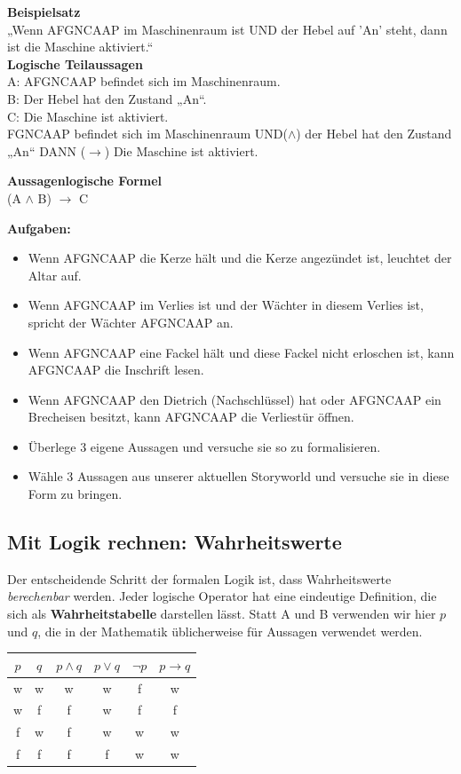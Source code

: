 \documentclass[parskip=half,a4paper,11pt]{scrreprt}
\begin{document}
\textbf{Beispielsatz} \\
„Wenn AFGNCAAP im Maschinenraum ist UND der Hebel auf 'An' steht, dann ist die Maschine aktiviert.“\\

\textbf{Logische Teilaussagen}\\
A: AFGNCAAP befindet sich im Maschinenraum. \\
B: Der Hebel hat den Zustand „An“. \\
C: Die Maschine ist aktiviert. \\

FGNCAAP befindet sich im Maschinenraum UND($\land$) der Hebel hat den Zustand „An“ DANN ($\rightarrow$)  Die Maschine ist aktiviert.

\textbf{Aussagenlogische Formel}\\
(A $\land$ B) $\rightarrow$ C

\textbf{Aufgaben:}
\begin{itemize}
    \item Wenn AFGNCAAP die Kerze hält und die Kerze angezündet ist, leuchtet der Altar auf.
    \item Wenn AFGNCAAP im Verlies ist und der Wächter in diesem Verlies ist, spricht der Wächter AFGNCAAP an.
    \item Wenn AFGNCAAP eine Fackel hält und diese Fackel nicht erloschen ist, kann AFGNCAAP die Inschrift lesen.
    \item Wenn AFGNCAAP den Dietrich (Nachschlüssel) hat oder AFGNCAAP ein Brecheisen besitzt, kann AFGNCAAP die Verliestür öffnen.
    \item Überlege 3 eigene Aussagen und versuche sie so zu formalisieren.
    \item Wähle 3 Aussagen aus unserer aktuellen Storyworld und versuche sie in diese Form zu bringen.
\end{itemize}

\subsection{Mit Logik rechnen: Wahrheitswerte}

Der entscheidende Schritt der formalen Logik ist, dass Wahrheitswerte \textit{berechenbar} werden. Jeder logische Operator hat eine eindeutige Definition, die sich als \textbf{Wahrheitstabelle} darstellen lässt. Statt A und B verwenden wir hier $p$ und $q$, die in der Mathematik üblicherweise für Aussagen verwendet werden.

\begin{center}
\begin{tabular}{cc|cccc}
$p$ & $q$ & $p \land q$ & $p \lor q$ & $\neg p$ & $p \rightarrow q$ \\
\hline
w & w & w & w & f & w \\
w & f & f & w & f & f \\
f & w & f & w & w & w \\
f & f & f & f & w & w \\
\end{tabular}
\end{center}
\end{document}
